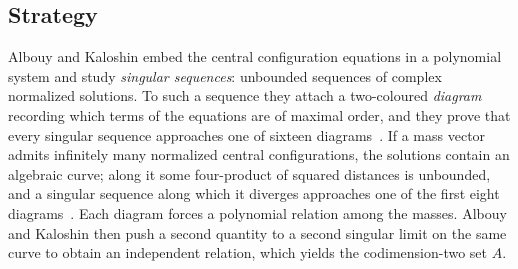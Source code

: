 \documentclass[11pt]{amsart}
\theoremstyle{definition}
\theoremstyle{remark}
\begin{document}
\subsection*{Strategy}
Albouy and Kaloshin embed the central configuration equations in a polynomial system and
study \emph{singular sequences}: unbounded sequences of complex normalized solutions.  To such a
sequence they attach a two-coloured \emph{diagram} recording which terms of the equations are
of maximal order, and they prove that every singular sequence approaches one of sixteen
diagrams~\cite[Fig.~11]{AK}.  If a mass vector admits infinitely many normalized central
configurations, the solutions contain an algebraic curve; along it some four-product of squared
distances is unbounded, and a singular sequence along which it diverges approaches one of the
first eight diagrams~\cite[Props.~8--9 and proof of Thm.~6]{AK}.  Each diagram forces a polynomial
relation among the masses.  Albouy and Kaloshin then push a second quantity to a second singular
limit on the same curve to obtain an independent relation, which yields the codimension-two set
$A$.
\end{document}
